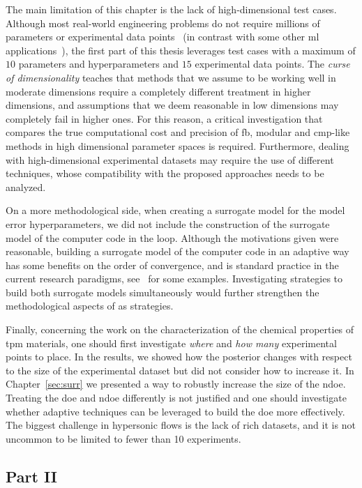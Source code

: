 \smallskip
The main limitation of this chapter is the lack of high-dimensional test cases. Although most real-world engineering problems do not require millions of parameters or experimental data points~\cite{uq_theory} (in contrast with some other \gls{ml} applications~\cite{gp_rasmussen}), the first part of this thesis leverages test cases with a maximum of $10$ parameters and hyperparameters and $15$ experimental data points. The \textit{curse of dimensionality} teaches that methods that we assume to be working well in moderate dimensions require a completely different treatment in higher dimensions, and assumptions that we deem reasonable in low dimensions may completely fail in higher ones. For this reason, a critical investigation that compares the true computational cost and precision of \gls{fb}, modular and \gls{cmp}-like methods in high dimensional parameter spaces is required. Furthermore, dealing with high-dimensional experimental datasets may require the use of different techniques, whose compatibility with the proposed approaches needs to be analyzed.

\smallskip
On a more methodological side, when creating a surrogate model for the model error hyperparameters, we did not include the construction of the surrogate model of the computer code in the loop. Although the motivations given were reasonable, building a surrogate model of the computer code in an adaptive way has some benefits on the order of convergence, and is standard practice in the current research paradigms, see~\cite{lucor2018, phd3} for some examples. Investigating strategies to build both surrogate models simultaneously would further strengthen the methodological aspects of \gls{as} strategies.

\smallskip
Finally, concerning the work on the characterization of the chemical properties of \gls{tpm} materials, one should first investigate \textit{where} and \textit{how many} experimental points to place. In the results, we showed how the posterior changes with respect to the size of the experimental dataset but did not consider how to increase it. In Chapter~\ref{sec:surr} we presented a way to robustly increase the size of the \gls{ndoe}. Treating the \gls{doe} and \gls{ndoe} differently is not justified and one should investigate whether adaptive techniques can be leveraged to build the \gls{doe} more effectively. The biggest challenge in hypersonic flows is the lack of rich datasets, and it is not uncommon to be limited to fewer than 10 experiments. 


\subsection{Part II}


